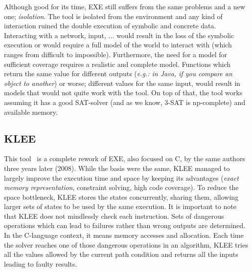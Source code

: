 \documentclass[11pt]{IEEEtran}
\begin{document}
    Although good for its time, EXE still suffers from the same problems and a new one; \emph{isolation}. The tool is isolated from the environment and any kind of interaction ruined the double execution of symbolic and concrete data. Interacting with a network, input, ... would result in the loss of the symbolic execution or would require a full model of the world to interact with (which ranges from difficult to impossible). Furthermore, the need for a model for sufficient coverage requires a realistic and complete model. Functions which return the same value for different outputs (\emph{e.g.: in Java, if you compare an object to another}) or worse; different values for the same input, would result in models that would not quite work with the tool. On top of that, the tool works assuming it has a good SAT-solver (and as we know, 3-SAT is np-complete) and available memory.

  \subsection{KLEE}
    \label{subsec:klee}
    This tool~\cite{klee} is a complete rework of EXE, also focused on C, by the same authors three years later (2008). While the basis were the same, KLEE managed to largely improve the execution time and space by keeping its advantages (\emph{exact memory representation}, constraint solving, high code coverage). To reduce the space bottleneck, KLEE stores the states concurrently, sharing them, allowing larger sets of states to be used by the same execution. It is important to note that KLEE does not mindlessly check each instruction. Sets of dangerous operations which can lead to failures rather than wrong outputs are determined. In the C-language context, it means memory accesses and allocation. Each time the solver reaches one of those dangerous operations in an algorithm, KLEE tries all the values allowed by the current path condition and returns all the inputs leading to faulty results.
\end{document}
